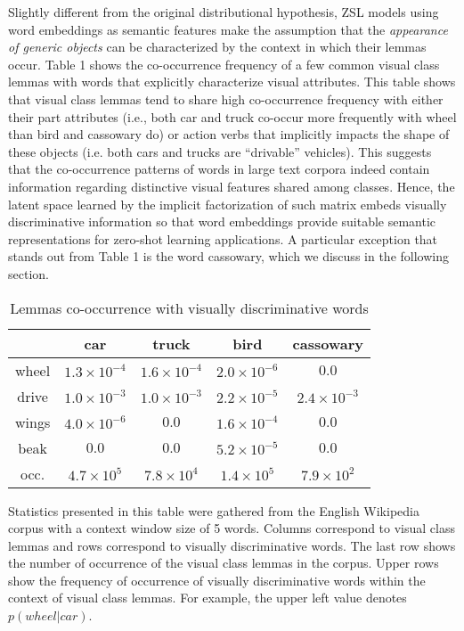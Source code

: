 Slightly different from the original distributional hypothesis, ZSL models using word embeddings as semantic features make the assumption that the \textit{appearance of generic objects} can be characterized by the context in which their lemmas occur. Table 1 shows the co-occurrence frequency of a few common visual class lemmas with words that explicitly characterize visual attributes. This table shows that visual class lemmas tend to share high co-occurrence frequency with either their part attributes (i.e., both car and truck co-occur more frequently with wheel than bird and cassowary do) or action verbs that implicitly impacts the shape of these objects (i.e. both cars and trucks are ``drivable'' vehicles). This suggests that the co-occurrence patterns of words in large text corpora indeed contain information regarding distinctive visual features shared among classes. Hence, the latent space learned by the implicit factorization of such matrix embeds visually discriminative information so that word embeddings provide suitable semantic representations for zero-shot learning applications. A particular exception that stands out from Table 1 is the word cassowary, which we discuss in the following section.

\begin{table}[t]
\centering
\caption{Lemmas co-occurrence with visually discriminative words}
\begin{tabular}{ c c c c c}			
 & car & truck & bird & cassowary\\
\hline			
wheel     & $1.3 \times 10^{-4}$ & $1.6 \times 10^{-4}$ & $2.0 \times 10^{-6}$ & $0.0$ \\
drive     & $1.0 \times 10^{-3}$ & $1.0 \times 10^{-3}$ & $2.2 \times 10^{-5}$ & $2.4 \times 10^{-3}$ \\
wings     & $4.0 \times 10^{-6}$ & $0.0$ & $1.6\times 10^{-4}$ & $0.0$ \\
beak      & $0.0$ & $0.0$ & $5.2\times 10^{-5}$ & $0.0$ \\
\hline
occ. & $4.7 \times 10^{5}$ & $7.8 \times 10^{4}$ & $1.4 \times 10^{5}$ & $7.9 \times 10^{2}$  \\
\hline	
\end{tabular}
Statistics presented in this table were gathered from the English Wikipedia corpus with a context window size of 5 words. Columns correspond to visual class lemmas and rows correspond to visually discriminative words. The last row shows the number of occurrence of the visual class lemmas in the corpus. Upper rows show the frequency of occurrence of visually discriminative words within the context of visual class lemmas. For example, the upper left value denotes $p(wheel|car)$.
\end{table}
